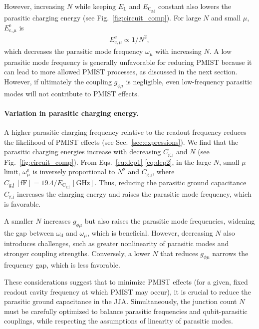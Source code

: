 \documentclass[%
reprint,
superscriptaddress,
 amsmath,amssymb,
 aps,
 prx,
longbibliography,
floatfix,
]{revtex4-2}
\begin{document}
However, increasing \( N \) while keeping \( E_\textrm{L} \) and \( E_{\textrm{C}_\textrm{g,j}} \) constant also lowers the parasitic charging energy (see Fig.~\ref{fig:circuit_comp}). For large \( N \) and small \( \mu \), $E_{\textrm{c},\mu}^\textrm{e}$ is
\begin{align}
 E_{\textrm{c},\mu}^\textrm{e} \propto 1/N^2,\label{eq:dep2}
\end{align}
which decreases the parasitic mode frequency \( \omega_\mu \) with increasing \( N \). A low parasitic mode frequency is generally unfavorable for reducing PMIST because it can lead to more allowed PMIST processes, as discussed in the next section. However, if ultimately the coupling \( g_{\phi\mu} \) is negligible, even low-frequency parasitic modes will not contribute to PMIST effects.
\paragraph{Variation in parasitic charging energy.}\label{par-freq} 
A higher parasitic charging frequency relative to the readout frequency reduces the likelihood of PMIST effects (see Sec.~\ref{sec:expressions}). We find that the parasitic charging energies increase with decreasing \( C_\textrm{g,j} \) and \( N \) (see Fig.~\ref{fig:circuit_comp}). From Eqs.~\ref{eq:dep1}-\ref{eq:dep2}, in the large-\( N \), small-\( \mu \) limit, \( \omega_\mu^\textrm{e} \) is inversely proportional to \( N^2 \) and \( C_\textrm{g,j} \), where \( C_\textrm{g,j} \, [\mathrm{fF}] = 19.4 / E_{\textrm{C}_\textrm{g,j}} \, [\mathrm{GHz}] \). Thus, reducing the parasitic ground capacitance \( C_\textrm{g,j} \) increases the charging energy and raises the parasitic mode frequency, which is favorable.

A smaller \( N \) increases \( g_{\phi\mu} \) but also raises the parasitic mode frequencies, widening the gap between \( \omega_\textrm{d} \) and \( \omega_\mu \), which is beneficial. However, decreasing \( N \) also introduces challenges, such as greater nonlinearity of parasitic modes and stronger coupling strengths. Conversely, a lower \( N \) that reduces \( g_{\phi\mu} \) narrows the frequency gap, which is less favorable.

These considerations suggest that to minimize PMIST effects (for a given, fixed readout cavity frequency at which PMIST may occur), it is crucial to reduce the parasitic ground capacitance in the JJA. Simultaneously, the junction count \( N \) must be carefully optimized to balance parasitic frequencies and qubit-parasitic couplings, while respecting the assumptions of linearity of parasitic modes.
\end{document}

